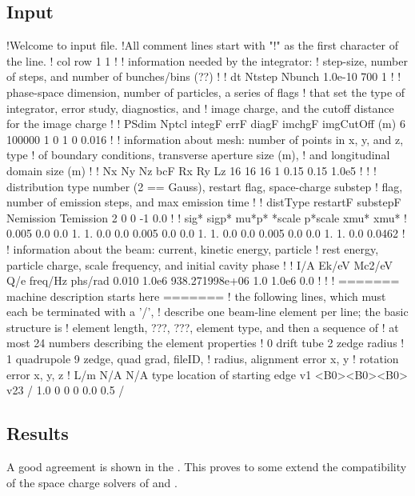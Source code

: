 \subsection{\impactt Input}
\begin{longexample}
!Welcome to \impactt input file.
!All comment lines start with "!" as the first character of the line.
! col row
1 1
!
! information needed by the integrator:
! step-size, number of steps, and number of bunches/bins (??)
!
!   dt    Ntstep  Nbunch
1.0e-10   700     1
!
! phase-space dimension, number of particles, a series of flags
! that set the type of integrator, error study, diagnostics, and
! image charge, and the cutoff distance for the image charge
!
! PSdim  Nptcl   integF  errF  diagF  imchgF  imgCutOff (m)
6 100000  1 0 1 0 0.016
!
! information about mesh: number of points in x, y, and z, type
! of boundary conditions, transverse aperture size (m),
! and longitudinal domain size (m)
!
!  Nx  Ny  Nz  bcF   Rx    Ry    Lz
16 16 16 1 0.15 0.15 1.0e5
!
!
! distribution type number (2 == Gauss), restart flag, space-charge substep
! flag, number of emission steps, and max emission time
!
! distType  restartF  substepF  Nemission  Temission
2           0         0         -1          0.0
!
!  sig*   sigp*  mu*p*  *scale  p*scale  xmu*      xmu*
!
0.005 0.0 0.0  1. 1. 0.0 0.0
0.005 0.0 0.0  1. 1. 0.0 0.0
0.005 0.0 0.0  1. 1. 0.0 0.0462
!
! information about the beam: current, kinetic energy, particle
! rest energy, particle charge, scale frequency, and initial cavity phase
!
! I/A   Ek/eV     Mc2/eV          Q/e  freq/Hz  phs/rad
0.010   1.0e6     938.271998e+06  1.0  1.0e6      0.0
!
!
! ======= machine description starts here =======
! the following lines, which must each be terminated with a '/',
! describe one beam-line element per line; the basic structure is
! element length, ???, ???, element type, and then a sequence of
! at most 24 numbers describing the element properties
!   0  drift tube    2      zedge radius
!   1  quadrupole    9      zedge, quad grad, fileID,
!                             radius, alignment error x, y
!                             rotation error x, y, z
! L/m  N/A N/A  type  location of starting edge  v1  <B0><B0><B0>  v23 /
1.0    0   0    0    0.0                           0.5            /
\end{longexample}

\subsection{Results}
A good agreement is shown in the . This proves to some extend the compatibility of the
space charge solvers of \opal and \impactt.

